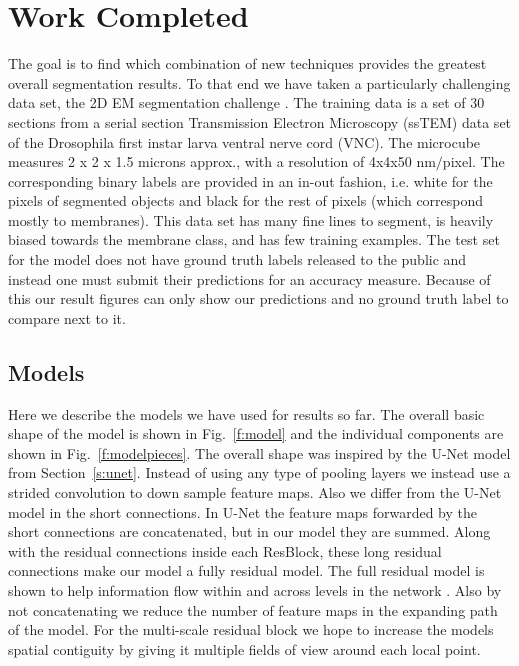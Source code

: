 \chapter{Work Completed}
The goal is to find which combination of new techniques provides the greatest overall segmentation results. To that end we have taken a particularly challenging data set, the 2D EM segmentation challenge \cite{emdata}. The training data is a set of 30 sections from a serial section Transmission Electron Microscopy (ssTEM) data set of the Drosophila first instar larva ventral nerve cord (VNC). The microcube measures 2 x 2 x 1.5 microns approx., with a resolution of 4x4x50 nm$/$pixel. The corresponding binary labels are provided in an in-out fashion, i.e. white for the pixels of segmented objects and black for the rest of pixels (which correspond mostly to membranes). This data set has many fine lines to segment, is heavily biased towards the membrane class, and has few training examples. The test set for the model does not have ground truth labels released to the public and instead one must submit their predictions for an accuracy measure. Because of this our result figures can only show our predictions and no ground truth label to compare next to it.

\section{Models}
Here we describe the models we have used for results so far. The overall basic shape of the model is shown in Fig.~\ref{f:model} and the individual components are shown in Fig.~\ref{f:modelpieces}. The overall shape was inspired by the U-Net model from Section~\ref{s:unet}. Instead of using any type of pooling layers we instead use a strided convolution to down sample feature maps. Also we differ from the U-Net model in the short connections. In U-Net the feature maps forwarded by the short connections are concatenated, but in our model they are summed. Along with the residual connections inside each ResBlock, these long residual connections make our model a fully residual model. The full residual model is shown to help information flow within and across levels in the network \cite{quan2016fusionnet}. Also by not concatenating we reduce the number of feature maps in the expanding path of the model. For the multi-scale residual block we hope to increase the models spatial contiguity by giving it multiple fields of view around each local point.

